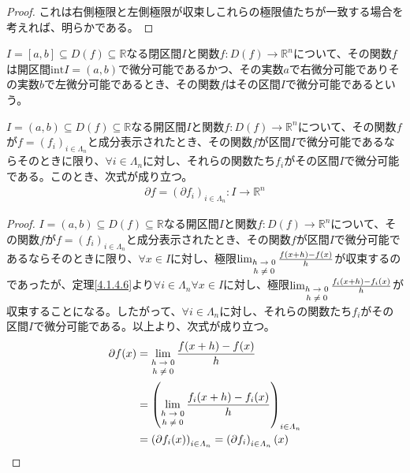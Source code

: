 \documentclass[dvipdfmx]{jsarticle}
\begin{document}
\begin{proof}
これは右側極限と左側極限が収束しこれらの極限値たちが一致する場合を考えれば、明らかである。
\end{proof}
\begin{dfn}
$I = [ a,b] \subseteq D(f) \subseteq \mathbb{R}$なる閉区間$I$と関数$f:D(f) \rightarrow \mathbb{R}^{n}$について、その関数$f$は開区間$\mathrm{int}I = (a,b)$で微分可能であるかつ、その実数$a$で右微分可能でありその実数$b$で左微分可能であるとき、その関数$f$はその区間$I$で微分可能であるという。
\end{dfn}
\begin{thm}\label{4.2.1.2}
$I = (a,b) \subseteq D(f) \subseteq \mathbb{R}$なる開区間$I$と関数$f:D(f) \rightarrow \mathbb{R}^{n}$について、その関数$f$が$f = \left( f_{i} \right)_{i \in \varLambda_{n}}$と成分表示されたとき、その関数$f$が区間$I$で微分可能であるならそのときに限り、$\forall i \in \varLambda_{n}$に対し、それらの関数たち$f_{i}$がその区間$I$で微分可能である。このとき、次式が成り立つ。
\begin{align*}
\partial f = \left( \partial f_{i} \right)_{i \in \varLambda_{n}}:I \rightarrow \mathbb{R}^{n}
\end{align*}
\end{thm}
\begin{proof}
$I = (a,b) \subseteq D(f) \subseteq \mathbb{R}$なる開区間$I$と関数$f:D(f) \rightarrow \mathbb{R}^{n}$について、その関数$f$が$f = \left( f_{i} \right)_{i \in \varLambda_{n}}$と成分表示されたとき、その関数$f$が区間$I$で微分可能であるならそのときに限り、$\forall x \in I$に対し、極限$\lim_{\scriptsize \begin{matrix}
h \rightarrow 0 \\
h \neq 0 \\
\end{matrix}}\frac{f(x + h) - f(x)}{h}$が収束するのであったが、定理\ref{4.1.4.6}より$\forall i \in \varLambda_{n}\forall x \in I$に対し、極限$\lim_{\scriptsize \begin{matrix}
h \rightarrow 0 \\
h \neq 0 \\
\end{matrix}}\frac{f_{i}(x + h) - f_{i}(x)}{h}$が収束することになる。したがって、$\forall i \in \varLambda_{n}$に対し、それらの関数たち$f_{i}$がその区間$I$で微分可能である。以上より、次式が成り立つ。
\begin{align*}
\partial f(x) &= \lim_{\scriptsize \begin{matrix}
h \rightarrow 0 \\
h \neq 0 \\
\end{matrix}}\frac{f(x + h) - f(x)}{h}\\
&= \left( \lim_{\scriptsize \begin{matrix}
h \rightarrow 0 \\
h \neq 0 \\
\end{matrix}}\frac{f_{i}(x + h) - f_{i}(x)}{h} \right)_{i \in \varLambda_{n}}\\
&= \left( \partial f_{i}(x) \right)_{i \in \varLambda_{n}} = \left( \partial f_{i} \right)_{i \in \varLambda_{n}}(x)
\end{align*}
\end{proof}
\end{document}
